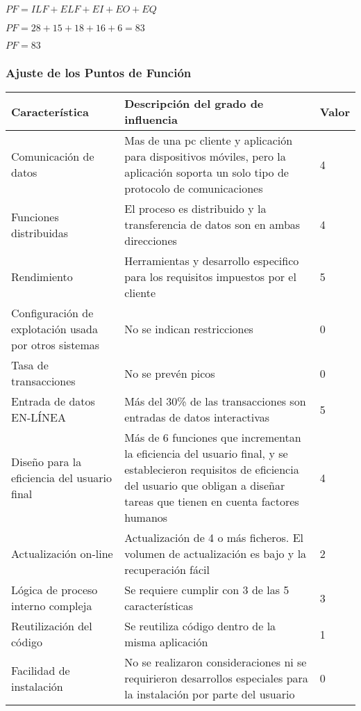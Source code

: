     $PF = ILF + ELF + EI + EO + EQ$
    
    $PF = 28 + 15 + 18 + 16 + 6 = 83$
    
    $PF = 83$
    
    \subsubsection{Ajuste de los Puntos de Función}
        
   \begin{table}[H]
   \centering
    \begin{tabular}{|p{5cm}|p{10cm}|l|}
        \hline
        Característica & Descripción del grado de influencia & Valor \\ \hline
        Comunicación de datos & Mas de una pc cliente y aplicación para dispositivos móviles, pero la aplicación soporta un solo tipo de protocolo de comunicaciones & 4 \\ \hline
        Funciones distribuidas & El proceso es distribuido y la transferencia de datos son en ambas direcciones & 4 \\ \hline
        Rendimiento & Herramientas y desarrollo especifico para los requisitos impuestos por el cliente & 5 \\ \hline
        Configuración de explotación usada por otros sistemas & No se indican restricciones & 0 \\ \hline
        Tasa de transacciones & No se prevén picos & 0 \\ \hline
        Entrada de datos EN-LÍNEA & Más del 30\% de las transacciones son entradas de datos interactivas & 5 \\ \hline
        Diseño para la eficiencia del usuario final & Más de 6 funciones que incrementan la eficiencia del usuario final, y se establecieron requisitos de eficiencia del usuario que obligan a diseñar tareas que tienen en cuenta factores humanos & 4 \\ \hline
        Actualización on-line & Actualización de 4 o más ficheros. El volumen de actualización es bajo y la recuperación fácil & 2 \\ \hline
        Lógica de proceso interno compleja & Se requiere cumplir con 3 de las 5 características & 3 \\ \hline
        Reutilización del código & Se reutiliza código dentro de la misma aplicación & 1 \\ \hline
        Facilidad de instalación & No se realizaron consideraciones ni se requirieron desarrollos especiales para la instalación por parte del usuario & 0 \\ \hline
    \end{tabular}
\end{table}
